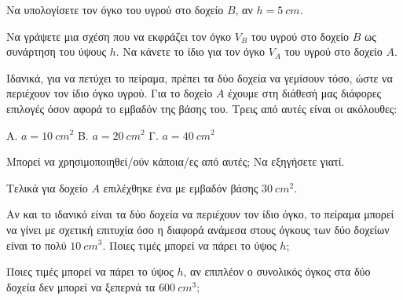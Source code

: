 \begin{alist}
\item

\begin{rlist}
\item Να υπολογίσετε τον όγκο του υγρού στο δοχείο $B$, αν $h = 5\ cm$.
\item Να γράψετε μια σχέση που να εκφράζει τον όγκο $V_{B}$ του υγρού στο δοχείο $B$ ως συνάρτηση του ύψους $h$. Να κάνετε το ίδιο για τον όγκο $V_{A}$ του υγρού στο δοχείο $A$.
\end{rlist}
\item Ιδανικά, για να πετύχει το πείραμα, πρέπει τα δύο δοχεία να γεμίσουν τόσο, ώστε να περιέχουν τον ίδιο όγκο υγρού. Για το δοχείο $A$ έχουμε στη διάθεσή μας διάφορες επιλογές όσον αφορά το εμβαδόν της βάσης του. Τρεις από αυτές είναι οι ακόλουθες:
\begin{center}
Α. $a = 10\ cm^{2}$ \quad Β. $a = 20\ cm^{2}$ \quad Γ. $a = 40\ cm^{2}$
\end{center}
Μπορεί να χρησιμοποιηθεί/ούν κάποια/ες από αυτές; Να εξηγήσετε γιατί.
\item Τελικά για δοχείο $A$ επιλέχθηκε ένα με εμβαδόν βάσης $30\ cm^{2}$.

\begin{rlist}
\item Αν και το ιδανικό είναι τα δύο δοχεία να περιέχουν τον ίδιο όγκο, το πείραμα μπορεί να γίνει με σχετική επιτυχία όσο η διαφορά ανάμεσα στους όγκους των δύο δοχείων είναι το πολύ $10\ cm^{3}$. Ποιες τιμές μπορεί να πάρει το ύψος $h$;
\item Ποιες τιμές μπορεί να πάρει το ύψος $h$, αν επιπλέον ο συνολικός όγκος στα δύο δοχεία δεν μπορεί να ξεπερνά τα $600\ cm^{3}$;
\end{rlist}
\end{alist}

